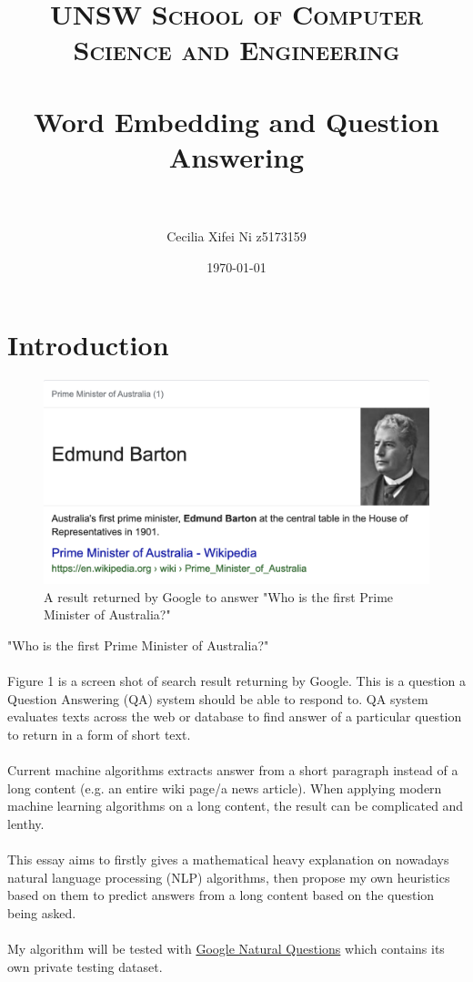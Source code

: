 \documentclass[paper=a4, fontsize=12pt]{scrartcl}
\title{	\normalfont \normalsize
\textsc{UNSW School of Computer Science and Engineering} \\ [24pt]
\horrule{1pt} \\[0.5cm] %
\LARGE Word Embedding and Question Answering \\ %
\horrule{1pt} \\[0.5cm] %
}
\author{Cecilia Xifei Ni z5173159} %
\date{\normalsize\today} %
\begin{document}
\thispagestyle{empty}

\maketitle %
\section{Introduction}
\begin{figure}
  \includegraphics[width=\linewidth]{google.png}
  \caption{A result returned by Google to answer "Who is the first Prime Minister of Australia?"}
  \label{fig:google}
\end{figure}
"Who is the first Prime Minister of Australia?" \\\\
Figure 1 is a screen shot of search result returning by Google. This is a question a Question Answering (QA) system should be able to respond to. QA system evaluates texts across the web or database to find answer of a particular question to return in a form of short text.\\\\
Current machine algorithms extracts answer from a short paragraph instead of a long content (e.g. an entire wiki page/a news article). When applying modern machine learning algorithms on a long content, the result can be complicated and lenthy. \\\\
This essay aims to firstly gives a mathematical heavy explanation on nowadays natural language processing (NLP) algorithms, then propose my own heuristics based on them to predict answers from a long content based on the question being asked. \\\\
My algorithm will be tested with \href{https://ai.google.com/research/NaturalQuestions/dataset}{Google Natural Questions} which contains its own private testing dataset. 
\end{document}
